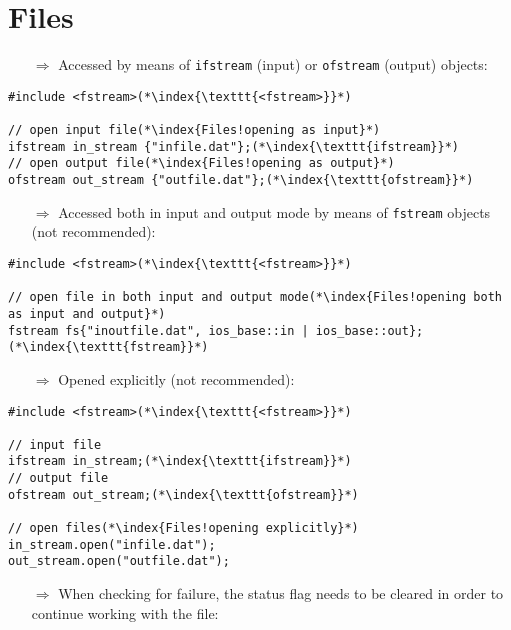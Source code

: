 \documentclass[10pt]{article}
\begin{document}
\section{Files}
\small
\begin{enumerate}
\item[$\Rightarrow$] Accessed by means of \texttt{ifstream} (input) or
\texttt{ofstream} (output) objects:
\end{enumerate}
\begin{lstlisting}
#include <fstream>(*\index{\texttt{<fstream>}}*)

// open input file(*\index{Files!opening as input}*)
ifstream in_stream {"infile.dat"};(*\index{\texttt{ifstream}}*)
// open output file(*\index{Files!opening as output}*)
ofstream out_stream {"outfile.dat"};(*\index{\texttt{ofstream}}*)
\end{lstlisting}
\begin{enumerate}
\item[$\Rightarrow$] Accessed both in input and output mode by means of \texttt{fstream} objects (not recommended):
\end{enumerate}
\begin{lstlisting}
#include <fstream>(*\index{\texttt{<fstream>}}*)

// open file in both input and output mode(*\index{Files!opening both as input and output}*)
fstream fs{"inoutfile.dat", ios_base::in | ios_base::out};(*\index{\texttt{fstream}}*)
\end{lstlisting}
\begin{enumerate}
\item[$\Rightarrow$] Opened explicitly (not recommended):
\end{enumerate}
\begin{lstlisting}
#include <fstream>(*\index{\texttt{<fstream>}}*)

// input file 
ifstream in_stream;(*\index{\texttt{ifstream}}*)
// output file
ofstream out_stream;(*\index{\texttt{ofstream}}*)

// open files(*\index{Files!opening explicitly}*)
in_stream.open("infile.dat");
out_stream.open("outfile.dat");
\end{lstlisting}
\begin{enumerate}
\item[$\Rightarrow$] When checking for failure, the status flag needs to be cleared
in order to continue working with the file:
\end{enumerate}
\end{document}
